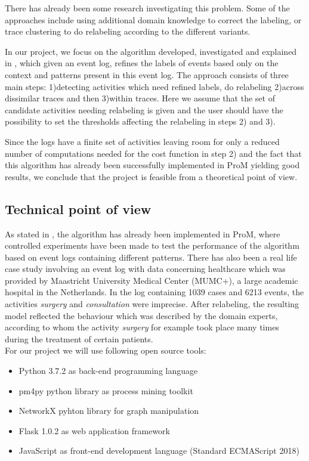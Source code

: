\documentclass[notitlepage]{article}
\begin{document}
\begin{flushleft}
There has already been some research investigating this problem. 
Some of the approaches include using additional domain knowledge to correct the labeling, or trace clustering to do relabeling according to the different variants.

In our project, we focus on the algorithm developed, investigated and explained in \cite{paper}, which given an event log, refines the labels of events based only on the context and patterns present in this event log.
The approach consists of three main steps: 1)detecting activities which need refined labels, do relabeling 2)across dissimilar traces and then 3)within traces.
Here we assume that the set of candidate activities needing relabeling is given and the user should have the possibility to set the thresholds affecting the relabeling in steps 2) and 3).

Since the logs have a finite set of activities leaving room for only a reduced number of computations needed for the cost function in step 2) and the fact that this algorithm has already been successfully implemented in ProM yielding good results, we conclude that the project is feasible from a theoretical point of view.\\

\subsection{Technical point of view}

As stated in \cite{paper}, the algorithm has already been implemented in ProM, where controlled experiments have been made to test the performance of the algorithm based on event logs containing different patterns.
There has also been a real life case study involving an event log with data concerning healthcare which was provided by Maastricht University Medical Center (MUMC+), a large academic hospital in the Netherlands.
In the log containing 1039 cases and 6213 events, the activities \textit{surgery} and \textit{consultation} were imprecise.
After relabeling, the resulting model reflected the behaviour which was described by the domain experts, according to whom the activity \textit{surgery} for example took place many times during the treatment of certain patients.\\
\medskip
For our project we will use following open source tools: 
\medskip
\begin{itemize}
	\item Python 3.7.2 as back-end programming language
	\item pm4py python library as process mining toolkit
  \item NetworkX pyhton library for graph manipulation
  \item Flask 1.0.2 as web application framework
	\item JavaScript as front-end development language (Standard ECMAScript 2018)
\end{itemize}


\end{flushleft}
\end{document}
